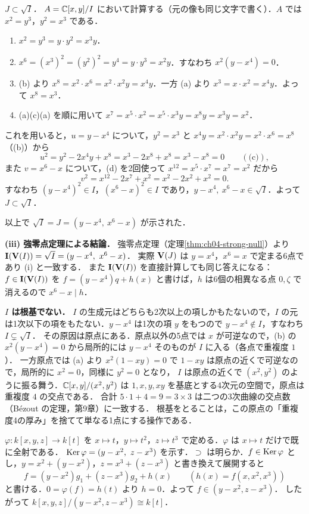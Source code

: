 \emph{$J\subset\sqrt I$．}
$A=\mathbb{C}[x,y]/I$ において計算する（元の像も同じ文字で書く）．$A$ では $x^2=y^3$，$y^2=x^3$ である．
\begin{enumerate}
  \item[(a)] $x^2=y^3=y\cdot y^2=x^3y$．
  \item[(b)] $x^6=(x^3)^2=(y^2)^2=y^4=y\cdot y^3=x^2y$．すなわち $x^2(y-x^4)=0$．
  \item[(c)] (b) より $x^8=x^2\cdot x^6=x^2\cdot x^2y=x^4y$．一方 (a) より $x^3=x\cdot x^2=x^4y$．よって $x^8=x^3$．
  \item[(d)] (a)(c)(a) を順に用いて $x^7=x^5\cdot x^2=x^5\cdot x^3y=x^8y=x^3y=x^2$．
\end{enumerate}
これを用いると，$u=y-x^4$ について，$y^2=x^3$ と $x^4y=x^2\cdot x^2y=x^2\cdot x^6=x^8$（(b)）から
\[
  u^2=y^2-2x^4y+x^8=x^3-2x^8+x^8=x^3-x^8=0\qquad(\text{(c)}),
\]
また $v=x^6-x$ について，(d) を2回使って $x^{12}=x^5\cdot x^7=x^7=x^2$ だから
\[
  v^2=x^{12}-2x^7+x^2=x^2-2x^2+x^2=0 .
\]
すなわち $(y-x^4)^2\in I$，$(x^6-x)^2\in I$ であり，$y-x^4,\ x^6-x\in\sqrt I$．よって $J\subset\sqrt I$．

以上で $\sqrt I=J=(y-x^4,\ x^6-x)$ が示された．

\textbf{(iii) 強零点定理による結論．}
強零点定理（定理\ref{thm:ch04-strong-null}）より $\Ideal(\Zero(I))=\sqrt I=(y-x^4,\ x^6-x)$．
実際 $\mathbf{V}(J)$ は $y=x^4$，$x^6=x$ で定まる6点であり (i) と一致する．
また $\mathbf{I}(\mathbf{V}(I))$ を直接計算しても同じ答えになる：$f\in\mathbf{I}(\mathbf{V}(I))$ を $f=(y-x^4)q+h(x)$ と書けば，$h$ は6個の相異なる点 $0,\zeta$ で消えるので $x^6-x\mid h$．

\textbf{$I$ は根基でない．}
$I$ の生成元はどちらも2次以上の項しかもたないので，$I$ の元は1次以下の項をもたない．$y-x^4$ は1次の項 $y$ をもつので $y-x^4\notin I$，すなわち $I\subsetneq\sqrt I$．
その原因は原点にある．原点以外の5点では $x$ が可逆なので，(b) の $x^2(y-x^4)=0$ から局所的には $y-x^4$ そのものが $I$ に入る（各点で重複度 $1$）．
一方原点では (a) より $x^2(1-xy)=0$ で $1-xy$ は原点の近くで可逆なので，局所的に $x^2=0$，同様に $y^2=0$ となり，
$I$ は原点の近くで $(x^2,y^2)$ のように振る舞う．$\mathbb{C}[x,y]/(x^2,y^2)$ は $1,x,y,xy$ を基底とする4次元の空間で，原点は重複度 $4$ の交点である．
合計 $5\cdot1+4=9=3\times3$ は二つの3次曲線の交点数（Bézout の定理，第9章）に一致する．
根基をとることは，この原点の「重複度4の厚み」を捨てて単なる1点にする操作である．

$\varphi\colon k[x,y,z]\to k[t]$ を $x\mapsto t$，$y\mapsto t^2$，$z\mapsto t^3$ で定める．$\varphi$ は $x\mapsto t$ だけで既に全射である．
$\Ker\varphi=(y-x^2,\ z-x^3)$ を示す．$\supset$ は明らか．$f\in\operatorname{Ker}\varphi$ とし，$y=x^2+(y-x^2)$，$z=x^3+(z-x^3)$ と書き換えて展開すると
\[
  f=(y-x^2)g_1+(z-x^3)g_2+h(x)\qquad(h(x)=f(x,x^2,x^3))
\]
と書ける．$0=\varphi(f)=h(t)$ より $h=0$．よって $f\in(y-x^2,z-x^3)$．
したがって $k[x,y,z]/(y-x^2,z-x^3)\cong k[t]$．

